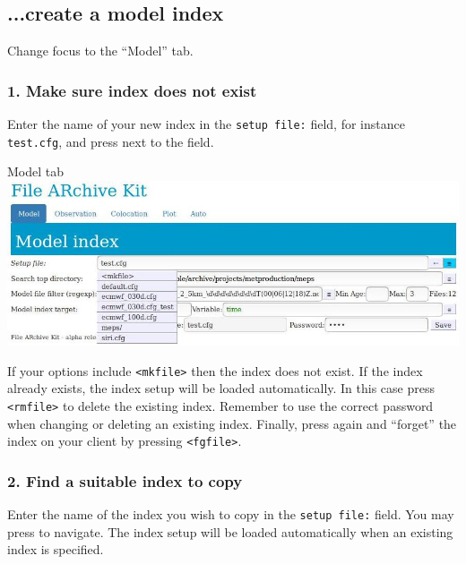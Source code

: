 \documentclass[letterpaper,10pt,twoside,twocolumn,openany]{book}
\begin{document}
\subsection{...create a model index}
Change focus to the ``Model'' tab.
\subsubsection{1. Make sure index does not exist}
Enter the name of your new index in the \lstinline!setup file:! field, for instance \lstinline!test.cfg!,
and press   next to the field.
\begin{paperbox}{Model tab}
  \includegraphics[width=\columnwidth]{how_mod.jpg}
\end{paperbox}
If your options include \lstinline!<mkfile>! then the index does not exist.
If the index already exists, the index setup will be loaded automatically.
In this case press \lstinline!<rmfile>! to delete the existing index.
Remember to use the correct password when changing or deleting an existing index.
Finally, press  again and ``forget'' the index on your client by pressing  \lstinline!<fgfile>!.
\subsubsection{2. Find a suitable index to copy}
Enter the name of the index you wish to copy in the \lstinline!setup file:! field.
You may press  to navigate.
The index setup will be loaded automatically when an existing index is specified.
\end{document}
